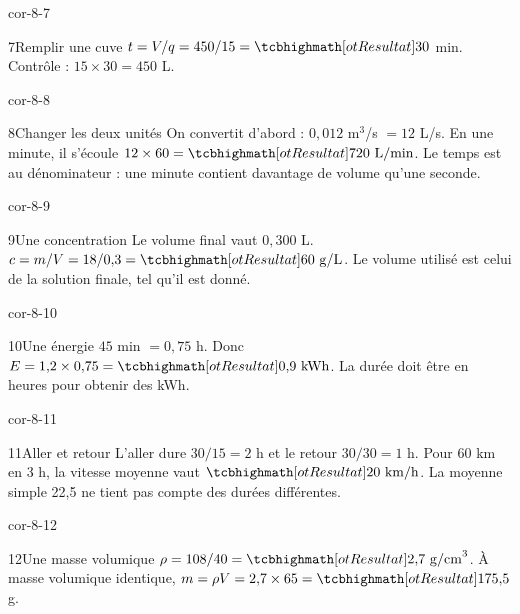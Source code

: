 \begin{blocLivre}{cor-8-7}\begin{corrige}{7}{Remplir une cuve}
$t=V/q=450/15=\res{30}$ min. Contrôle : $15\times30=450$ L.
\end{corrige}\end{blocLivre}
\begin{blocLivre}{cor-8-8}\begin{corrige}{8}{Changer les deux unités}
On convertit d’abord : $0{,}012$ m$^3$/s $=12$ L/s. En une minute, il s’écoule $12\times60=\res{720\ \mathrm{L/min}}$. Le temps est au dénominateur : une minute contient davantage de volume qu’une seconde.
\end{corrige}\end{blocLivre}
\begin{blocLivre}{cor-8-9}\begin{corrige}{9}{Une concentration}
Le volume final vaut $0{,}300$ L. $c=m/V=18/0{,}3=\res{60\ \mathrm{g/L}}$. Le volume utilisé est celui de la solution finale, tel qu’il est donné.
\end{corrige}\end{blocLivre}
\begin{blocLivre}{cor-8-10}\begin{corrige}{10}{Une énergie}
$45$ min $=0{,}75$ h. Donc $E=1{,}2\times0{,}75=\res{0{,}9\ \mathrm{kWh}}$. La durée doit être en heures pour obtenir des kWh.
\end{corrige}\end{blocLivre}
\begin{blocLivre}{cor-8-11}\begin{corrige}{11}{Aller et retour}
L’aller dure $30/15=2$ h et le retour $30/30=1$ h. Pour 60 km en 3 h, la vitesse moyenne vaut $\res{20\ \mathrm{km/h}}$. La moyenne simple 22,5 ne tient pas compte des durées différentes.
\end{corrige}\end{blocLivre}
\begin{blocLivre}{cor-8-12}\begin{corrige}{12}{Une masse volumique}
$\rho=108/40=\res{2{,}7\ \mathrm{g/cm}^3}$. À masse volumique identique, $m=\rho V=2{,}7\times65=\res{175{,}5}$ g.
\end{corrige}\end{blocLivre}
